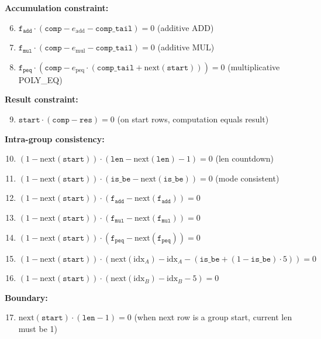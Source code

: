 \documentclass{article}
\theoremstyle{definition}
\begin{document}
\textbf{Accumulation constraint:}
\begin{enumerate}
    \setcounter{enumi}{5}
    \item $\texttt{f}_\texttt{add} \cdot (\texttt{comp} - e_\text{add} - \texttt{comp\_tail}) = 0$ \hfill (additive ADD)
    \item $\texttt{f}_\texttt{mul} \cdot (\texttt{comp} - e_\text{mul} - \texttt{comp\_tail}) = 0$ \hfill (additive MUL)
    \item $\texttt{f}_\texttt{peq} \cdot (\texttt{comp} - e_\text{peq} \cdot (\texttt{comp\_tail} + \text{next}(\texttt{start}))) = 0$ \hfill (multiplicative POLY\_EQ)
\end{enumerate}

\vspace{2mm}

\textbf{Result constraint:}
\begin{enumerate}
    \setcounter{enumi}{8}
    \item $\texttt{start} \cdot (\texttt{comp} - \texttt{res}) = 0$ \hfill (on start rows, computation equals result)
\end{enumerate}

\textbf{Intra-group consistency:}
\begin{enumerate}
    \setcounter{enumi}{9}
    \item $(1 - \text{next}(\texttt{start})) \cdot (\texttt{len} - \text{next}(\texttt{len}) - 1) = 0$ \hfill (len countdown)
    \item $(1 - \text{next}(\texttt{start})) \cdot (\texttt{is\_be} - \text{next}(\texttt{is\_be})) = 0$ \hfill (mode consistent)
    \item $(1 - \text{next}(\texttt{start})) \cdot (\texttt{f}_\texttt{add} - \text{next}(\texttt{f}_\texttt{add})) = 0$
    \item $(1 - \text{next}(\texttt{start})) \cdot (\texttt{f}_\texttt{mul} - \text{next}(\texttt{f}_\texttt{mul})) = 0$
    \item $(1 - \text{next}(\texttt{start})) \cdot (\texttt{f}_\texttt{peq} - \text{next}(\texttt{f}_\texttt{peq})) = 0$
    \item $(1 - \text{next}(\texttt{start})) \cdot (\text{next}(\text{idx}_A) - \text{idx}_A - (\texttt{is\_be} + (1 - \texttt{is\_be}) \cdot 5)) = 0$
    \item $(1 - \text{next}(\texttt{start})) \cdot (\text{next}(\text{idx}_B) - \text{idx}_B - 5) = 0$
\end{enumerate}

\textbf{Boundary:}
\begin{enumerate}
    \setcounter{enumi}{16}
    \item $\text{next}(\texttt{start}) \cdot (\texttt{len} - 1) = 0$ \hfill (when next row is a group start, current len must be 1)
\end{enumerate}
\end{document}
